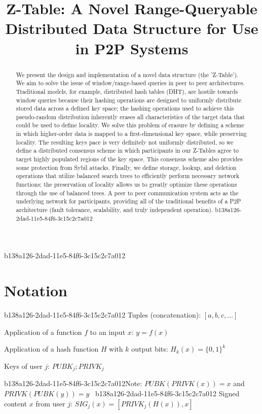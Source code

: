 \documentclass[12pt]{article}
\title{Z-Table: A Novel Range-Queryable Distributed Data Structure for Use in P2P Systems}
\begin{document}
b138a126-2dad-11e5-84f6-3c15c2c7a012\maketitle

\begin{abstract}
We present the design and implementation of a novel data structure (the 'Z-Table'). We aim to solve the issue of window/range-based queries in peer to peer architectures. Traditional models, for example,  distributed hash tables (DHT), are hostile towards window queries because their hashing operations are designed to uniformly distribute stored data across a defined key space; the hashing operations used to achieve this pseudo-random distribution inherently erases all characteristics of the target data that could be used to define locality. We solve this problem of erasure by defining a scheme in which higher-order data is mapped to a first-dimensional key space, while preserving locality. The resulting keys pace is very definitely not uniformly distributed, so we define a distributed consensus scheme in which participants in our Z-Tables agree to target highly populated regions of the key space. This consensus scheme also provides some protection from Sybil attacks. Finally, we define storage, lookup, and deletion operations that utilize balanced search trees to efficiently perform necessary network functions; the preservation of locality allows us to greatly optimize these operations through the use of balanced trees. A peer to peer communication system acts as the underlying network for participants, providing all of the traditional benefits of a P2P architecture (fault tolerance, scalability, and truly independent operation).
b138a126-2dad-11e5-84f6-3c15c2c7a012\end{abstract}

\section{Notation}
b138a126-2dad-11e5-84f6-3c15c2c7a012
Tuples (concatenation): $[a,b,c,...]$

Application of a function $f$ to an input $x$: $y=f(x)$

Application of a hash function $H$ with $k$ output bits: $H_{k}(x) = \{0,1\}^k$

Keys of user $j$: $ PUBK_j; PRIVK_j $

b138a126-2dad-11e5-84f6-3c15c2c7a012Note: $PUBK(PRIVK(x)) = x$ and $PRIVK(PUBK(y)) = y$~
b138a126-2dad-11e5-84f6-3c15c2c7a012
Signed content $x$ from user $j$: $SIG_j(x) = \left[ PRIVK_j( H(x) ), x \right]$
\end{document}
